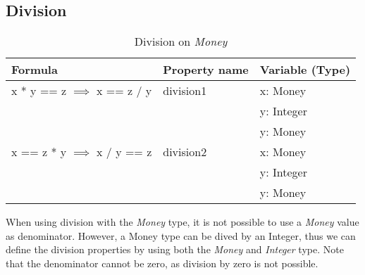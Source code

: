 \subsection*{Division}
\FloatBarrier
\begin{table}[!ht]
\centering
\begin{tabular}{lll}
\hline
                        \textbf{Formula}                 & \textbf{Property name} & \textbf{Variable (Type)} \\ \hline
\rowcolor[HTML]{EFEFEF} x * y == z $\implies$ x == z / y & division1              & x: Money                 \\
\rowcolor[HTML]{EFEFEF}                                  &                        & y: Integer               \\
\rowcolor[HTML]{EFEFEF}                                  &                        & y: Money                 \\
                        x == z * y $\implies$ x / y == z & division2              & x: Money                 \\
                                                         &                        & y: Integer               \\
                                                         &                        & y: Money                 \\ \hline
\end{tabular}
\caption{Division on \textit{Money}}
\label{tbl:ch4_money_division}
\end{table}
\FloatBarrier
When using division with the \textit{Money} type, it is not possible to use a \textit{Money} value as denominator. However, a Money type can be dived by an Integer, thus we can define the division properties by using both the \textit{Money} and \textit{Integer} type. Note that the denominator cannot be zero, as division by zero is not possible. %


